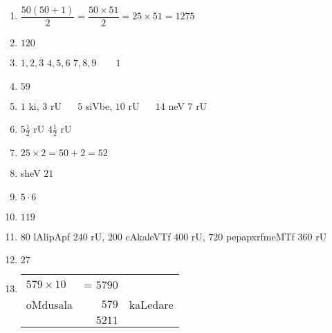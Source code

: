\begin{enumerate}
\item $\dfrac{50(50+1)}{2} = \dfrac{50 \times 51}{2} = 25 \times 51 = 1275$
  
\item $120$

\item $1 , 2, 3$ \qquad $4,5,6$ \qquad $7 , 8,9 \qquad 1$

\item $59$

\item $1$ ki, $3$ rU ~~ $5$ siVbe, $10$ rU ~~ $14$ neV $7$ rU

\item $5 \frac{1}{2}$ rU $4\frac{1}{2}$ rU

\item $25 \times 2 = 50 +2 = 52$

\item sheV $21$

\item $5 \cdot 6$
  
\item $119$

\eject

\item $80$ lAlipApf $240$ rU, $200$ cAkaleVTf $400$ rU, $720$  pepapxrfmeMTf $360$ rU

\item $27$

\item
  \qquad \begin{tabular}[t]{lrl}
    $579 \times 10$ & = $5790$ & \\
    oMdusala & $579$ & kaLedare \\\cline{2-2}
    & $5211$ &
  \end{tabular}

\end{enumerate}
